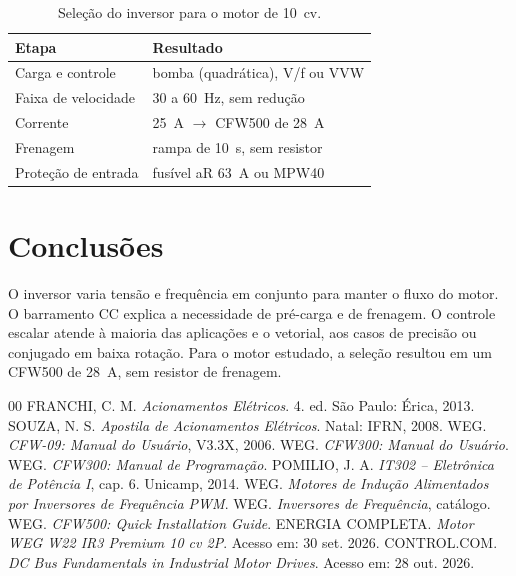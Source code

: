 \documentclass[conference]{IEEEtran}
\begin{document}
\begin{table}[H]
\centering
\caption{Seleção do inversor para o motor de 10~cv.}
\label{tab:selecao}
\begin{tabular}{ll}
\hline
\textbf{Etapa} & \textbf{Resultado} \\
\hline
Carga e controle & bomba (quadrática), V/f ou VVW \\
Faixa de velocidade & 30 a 60~Hz, sem redução \\
Corrente & 25~A $\rightarrow$ CFW500 de 28~A \cite{b10} \\
Frenagem & rampa de 10~s, sem resistor \\
Proteção de entrada & fusível aR 63~A ou MPW40 \cite{b10} \\
\hline
\end{tabular}
\end{table}

\section{Conclusões}

O inversor varia tensão e frequência em conjunto para manter o fluxo do motor. O barramento CC explica a necessidade de pré-carga e de frenagem. O controle escalar atende à maioria das aplicações e o vetorial, aos casos de precisão ou conjugado em baixa rotação. Para o motor estudado, a seleção resultou em um CFW500 de 28~A, sem resistor de frenagem.

\begin{thebibliography}{00}
 FRANCHI, C. M. \textit{Acionamentos Elétricos}. 4. ed. São Paulo: Érica, 2013.
 SOUZA, N. S. \textit{Apostila de Acionamentos Elétricos}. Natal: IFRN, 2008.
 WEG. \textit{CFW-09: Manual do Usuário}, V3.3X, 2006.
 WEG. \textit{CFW300: Manual do Usuário}.
 WEG. \textit{CFW300: Manual de Programação}.
 POMILIO, J. A. \textit{IT302 -- Eletrônica de Potência I}, cap. 6. Unicamp, 2014.
 WEG. \textit{Motores de Indução Alimentados por Inversores de Frequência PWM}.
 WEG. \textit{Inversores de Frequência}, catálogo.
 WEG. \textit{CFW500: Quick Installation Guide}.
 ENERGIA COMPLETA. \textit{Motor WEG W22 IR3 Premium 10 cv 2P}. Acesso em: 30 set. 2026.
 CONTROL.COM. \textit{DC Bus Fundamentals in Industrial Motor Drives}. Acesso em: 28 out. 2026.
\end{thebibliography}
\end{document}

